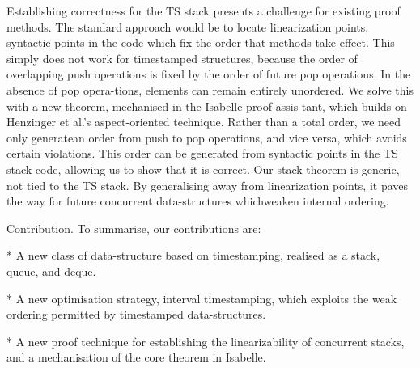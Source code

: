 Establishing correctness for the TS stack presents a challenge for existing
proof methods. 
The standard approach would be to locate linearization points, syntactic points
in the code which fix the order that methods take effect. 
This simply does not work for timestamped structures, because the order of
overlapping push operations is fixed by the order of future pop operations.
In the absence of pop opera-tions, elements can remain entirely unordered. 
We solve this with a new theorem, mechanised in the Isabelle proof assis-tant,
which builds on Henzinger et al.'s aspect-oriented technique. 
Rather than a total order, we need only generatean order from push to pop
operations, and vice versa, which avoids certain violations. 
This order can be generated from syntactic points in the TS stack code, allowing
us to show that it is correct. 
Our stack theorem is generic, not tied to the TS stack. 
By generalising away from linearization points, it paves the way for future
concurrent data-structures whichweaken internal ordering.

Contribution. To summarise, our contributions are:

* A new class of data-structure based on timestamping, realised as a stack,
queue, and deque.


* A new optimisation strategy, interval timestamping, which exploits the weak
ordering permitted by timestamped data-structures.

* A new proof technique for establishing the linearizability of concurrent
stacks, and a mechanisation of the core
theorem in Isabelle.

